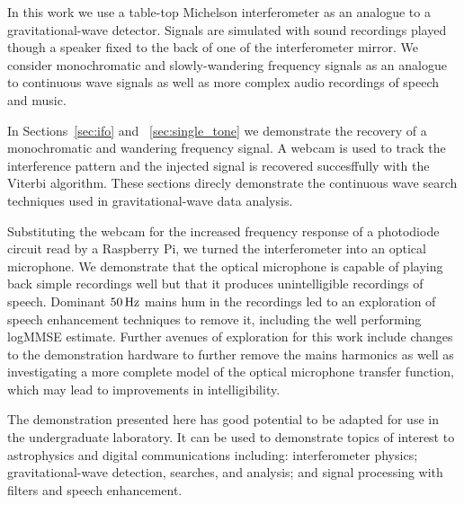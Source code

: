 \documentclass[paper-main.tex]{subfiles}
\begin{document}

In this work we use a table-top Michelson interferometer as an analogue to a gravitational-wave detector. 
Signals are simulated with sound recordings played though a speaker fixed to the back of one of the interferometer mirror. 
We consider monochromatic and slowly-wandering frequency signals as an analogue to continuous wave signals as well as more complex audio recordings of speech and music. 

In Sections~\ref{sec:ifo} and ~\ref{sec:single_tone} we demonstrate the recovery of a monochromatic and wandering frequency signal. 
A webcam is used to track the interference pattern and the injected signal is recovered succesffully with the Viterbi algorithm. 
These sections direcly demonstrate the continuous wave search techniques used in gravitational-wave data analysis. 


Substituting the webcam for the increased frequency response of a photodiode circuit read by a Raspberry Pi, we turned the interferometer into an optical microphone.
We demonstrate that the optical microphone is capable of playing back simple recordings well but that it produces unintelligible recordings of speech. 
Dominant $50\,{\rm Hz}$ mains hum in the recordings led to an exploration of speech enhancement techniques to remove it, including the well performing logMMSE estimate. 
Further avenues of exploration for this work include changes to the demonstration hardware to further remove the mains harmonics as well as investigating a more complete model of the optical microphone transfer function, which may lead to improvements in intelligibility. 


The demonstration presented here has good potential to be adapted for use in the undergraduate laboratory. 
It can be used to demonstrate topics of interest to astrophysics and digital communications including: interferometer physics; gravitational-wave detection, searches, and analysis; and signal processing with filters and speech enhancement. 
\end{document}
